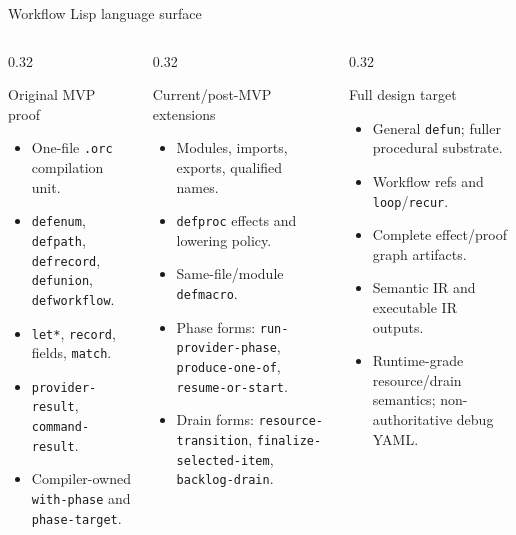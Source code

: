 \documentclass[aspectratio=169]{beamer}
\begin{document}
\begin{frame}[shrink=12]{Workflow Lisp language surface}
\scriptsize
\begin{columns}[T,totalwidth=\textwidth]
\begin{column}{0.32\textwidth}
\begin{block}{Original MVP proof}
\begin{itemize}
  \item One-file \texttt{.orc} compilation unit.
  \item \texttt{defenum}, \texttt{defpath}, \texttt{defrecord}, \texttt{defunion}, \texttt{defworkflow}.
  \item \texttt{let*}, \texttt{record}, fields, \texttt{match}.
  \item \texttt{provider-result}, \texttt{command-result}.
  \item Compiler-owned \texttt{with-phase} and \texttt{phase-target}.
\end{itemize}
\end{block}
\end{column}
\begin{column}{0.32\textwidth}
\begin{block}{Current/post-MVP extensions}
\begin{itemize}
  \item Modules, imports, exports, qualified names.
  \item \texttt{defproc} effects and lowering policy.
  \item Same-file/module \texttt{defmacro}.
  \item Phase forms: \texttt{run-provider-phase}, \texttt{produce-one-of}, \texttt{resume-or-start}.
  \item Drain forms: \texttt{resource-transition}, \texttt{finalize-selected-item}, \texttt{backlog-drain}.
\end{itemize}
\end{block}
\end{column}
\begin{column}{0.32\textwidth}
\begin{block}{Full design target}
\begin{itemize}
  \item General \texttt{defun}; fuller procedural substrate.
  \item Workflow refs and \texttt{loop}/\texttt{recur}.
  \item Complete effect/proof graph artifacts.
  \item Semantic IR and executable IR outputs.
  \item Runtime-grade resource/drain semantics; non-authoritative debug YAML.

\end{itemize}
\end{block}
\end{column}
\end{columns}
\end{frame}
\end{document}

